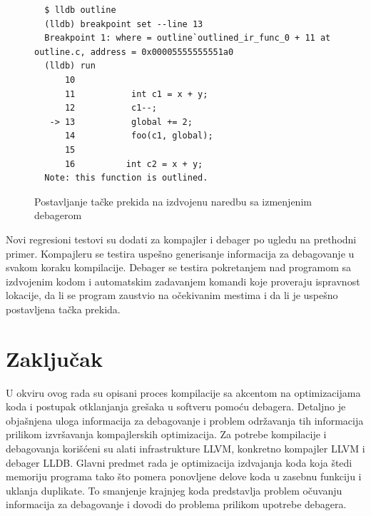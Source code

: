 \documentclass[12pt,oneside]{memoir}
\begin{document}
\begin{figure}[!ht]
\begin{verbatim}
  $ lldb outline
  (lldb) breakpoint set --line 13
  Breakpoint 1: where = outline`outlined_ir_func_0 + 11 at outline.c, address = 0x00005555555551a0
  (lldb) run
      10          
      11  	       int c1 = x + y;
      12  	       c1--;
   -> 13  	       global += 2;
      14  	       foo(c1, global);
      15          
      16          int c2 = x + y;
  Note: this function is outlined.
\end{verbatim}
\caption{Postavljanje tačke prekida na izdvojenu naredbu sa izmenjenim debagerom}
\label{lst:outlining_debug_breakpoint_after}
\end{figure}

Novi regresioni testovi su dodati za kompajler i debager po ugledu na prethodni primer.
Kompajleru se testira uspešno generisanje informacija za debagovanje u svakom koraku kompilacije.
Debager se testira pokretanjem nad programom sa izdvojenim kodom i automatskim zadavanjem komandi koje proveraju ispravnost lokacije, da li se program zaustvio na očekivanim mestima i da li je uspešno postavljena tačka prekida.


\chapter{Zaključak}
\label{sec:conclusion}

U okviru ovog rada su opisani proces kompilacije sa akcentom na optimizacijama koda i postupak otklanjanja grešaka u softveru pomoću debagera.
Detaljno je objašnjena uloga informacija za debagovanje i problem održavanja tih informacija prilikom izvršavanja kompajlerskih optimizacija.
Za potrebe kompilacije i debagovanja korišćeni su alati infrastrukture LLVM, konkretno kompajler LLVM i debager LLDB.
Glavni predmet rada je optimizacija izdvajanja koda koja štedi memoriju programa tako što pomera ponovljene delove koda u zasebnu funkciju i uklanja duplikate.
To smanjenje krajnjeg koda predstavlja problem očuvanju informacija za debagovanje i dovodi do problema prilikom upotrebe debagera.
\end{document}
